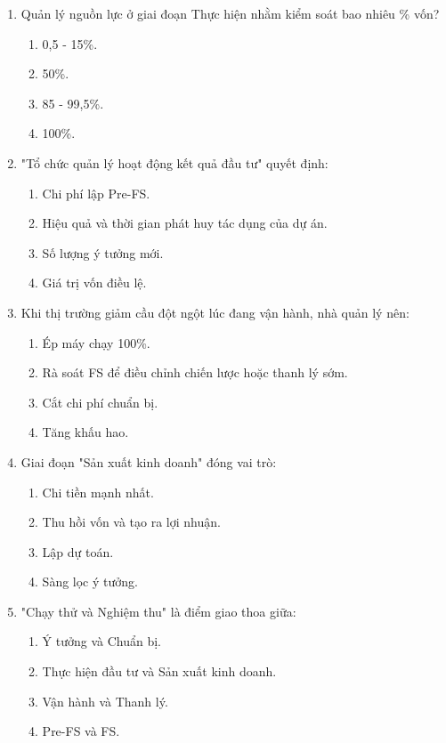 \begin{enumerate}[label=\textbf{Câu \arabic*:}, leftmargin=*, resume]
\item Quản lý nguồn lực ở giai đoạn Thực hiện nhằm kiểm soát bao nhiêu \% vốn?
\begin{enumerate}[label=\Alph*.]
    \item 0,5 - 15\%. \item 50\%. \item 85 - 99,5\%. \item 100\%.
\end{enumerate}

\item "Tổ chức quản lý hoạt động kết quả đầu tư" quyết định:
\begin{enumerate}[label=\Alph*.]
    \item Chi phí lập Pre-FS.
    \item Hiệu quả và thời gian phát huy tác dụng của dự án.
    \item Số lượng ý tưởng mới.
    \item Giá trị vốn điều lệ.
\end{enumerate}

\item Khi thị trường giảm cầu đột ngột lúc đang vận hành, nhà quản lý nên:
\begin{enumerate}[label=\Alph*.]
    \item Ép máy chạy 100\%.
    \item Rà soát FS để điều chỉnh chiến lược hoặc thanh lý sớm.
    \item Cắt chi phí chuẩn bị.
    \item Tăng khấu hao.
\end{enumerate}

\item Giai đoạn "Sản xuất kinh doanh" đóng vai trò:
\begin{enumerate}[label=\Alph*.]
    \item Chi tiền mạnh nhất.
    \item Thu hồi vốn và tạo ra lợi nhuận.
    \item Lập dự toán.
    \item Sàng lọc ý tưởng.
\end{enumerate}

\item "Chạy thử và Nghiệm thu" là điểm giao thoa giữa:
\begin{enumerate}[label=\Alph*.]
    \item Ý tưởng và Chuẩn bị.
    \item Thực hiện đầu tư và Sản xuất kinh doanh.
    \item Vận hành và Thanh lý.
    \item Pre-FS và FS.
\end{enumerate}


\end{enumerate}
